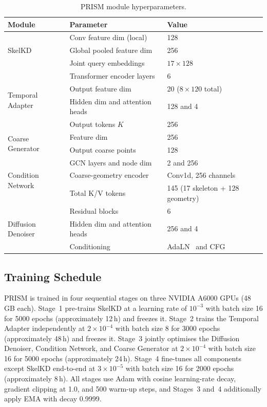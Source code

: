\documentclass{article}
\begin{document}
\begin{table}[h]
  \centering
  \caption{
    PRISM module hyperparameters.
  }
  \label{tab:arch}
  \small
  \setlength{\tabcolsep}{6pt}
  \begin{tabular}{lll}
    \toprule
    Module & Parameter & Value \\
    \midrule
    \multirow{3}{*}{SkelKD}
      & Conv feature dim (local)        & 128 \\
      & Global pooled feature dim       & 256 \\
      & Joint query embeddings          & $17\times128$ \\
    \midrule
    \multirow{4}{*}{Temporal Adapter}
      & Transformer encoder layers      & 6 \\
      & Output feature dim              & 20 ($8\times120$ total) \\
      & Hidden dim and attention heads  & 128 and 4 \\
      & Output tokens $K$               & 256 \\
    \midrule
    \multirow{2}{*}{Coarse Generator}
      & Feature dim                     & 256 \\
      & Output coarse points            & 128 \\
    \midrule
    \multirow{3}{*}{Condition Network}
      & GCN layers and node dim         & 2 and 256 \\
      & Coarse-geometry encoder         & Conv1d, 256 channels \\
      & Total K/V tokens                & 145 (17 skeleton + 128 geometry) \\
    \midrule
    \multirow{3}{*}{Diffusion Denoiser}
      & Residual blocks                 & 6 \\
      & Hidden dim and attention heads  & 256 and 4 \\
      & Conditioning                    & AdaLN~\cite{ba2016layer} and CFG~\cite{ho2022classifier} \\
    \bottomrule
  \end{tabular}
\end{table}

\subsection{Training Schedule}
\label{app:training}

PRISM is trained in four sequential stages on three NVIDIA A6000 GPUs (48\,GB each).
Stage~1 pre-trains SkelKD at a learning rate of $10^{-3}$ with batch size 16 for
5000 epochs (approximately 12\,h) and freezes it.
Stage~2 trains the Temporal Adapter independently at $2\!\times\!10^{-4}$ with batch size 8
for 3000 epochs (approximately 48\,h) and freezes it.
Stage~3 jointly optimises the Diffusion Denoiser, Condition Network, and Coarse Generator
at $2\!\times\!10^{-4}$ with batch size 16 for 5000 epochs
(approximately 24\,h).
Stage~4 fine-tunes all components except SkelKD end-to-end at $3\!\times\!10^{-5}$
with batch size 16 for 2000 epochs (approximately 8\,h).
All stages use Adam with cosine learning-rate decay, gradient clipping at 1.0, and 500 warm-up steps,
and Stages~3 and~4 additionally apply EMA with decay 0.9999.
\end{document}
